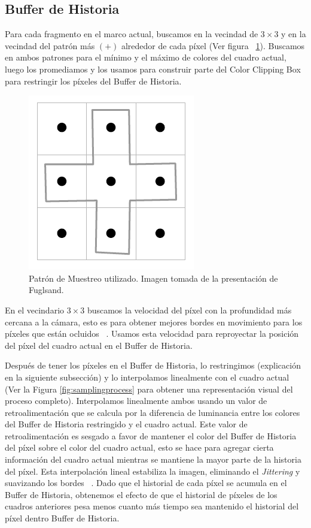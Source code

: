 \documentclass{cslthse-msc}
\begin{document}
\subsection{Buffer de Historia}
Para cada fragmento en el marco actual, buscamos en la vecindad de $3\times 3$ y en la vecindad del patrón más $(+)$ alrededor de cada píxel (Ver figura ~\ref{fig:samplingpattern}). Buscamos en ambos patrones para el mínimo y el máximo de colores del cuadro actual, luego los promediamos y los usamos para construir parte del Color Clipping Box para restringir los píxeles del Buffer de Historia. ~\cite{Fuglsand2016}
\begin{figure}[!hbt]
	\centering
	\includegraphics[scale=0.8]{images/sampling_pattern.png}
	\caption{Patrón de Muestreo utilizado. Imagen tomada de la presentación de Fuglsand. \protect\cite{Fuglsand2016}}\label{fig:samplingpattern}
\end{figure}

En el vecindario $3\times 3$ buscamos la velocidad del píxel con la profundidad más cercana a la cámara, esto es para obtener mejores bordes en movimiento para los píxeles que están ocluidos ~\cite{Fuglsand2016}. Usamos esta velocidad para reproyectar la posición del píxel del cuadro actual en el Buffer de Historia. ~\cite{Fuglsand2016, XU2016}

Después de tener los píxeles en el Buffer de Historia, lo restringimos (explicación en la siguiente subsección) y lo interpolamos linealmente con el cuadro actual (Ver la Figura \ref{fig:samplingprocess} para obtener una representación visual del proceso completo). Interpolamos linealmente ambos usando un valor de retroalimentación que se calcula por la diferencia de luminancia entre los colores del Buffer de Historia restringido y el cuadro actual. Este valor de retroalimentación es sesgado a favor de mantener el color del Buffer de Historia del píxel sobre el color del cuadro actual, esto se hace para agregar cierta información del cuadro actual mientras se mantiene la mayor parte de la historia del píxel. Esta interpolación lineal estabiliza la imagen, eliminando el \textit{Jittering} y suavizando los bordes ~\cite{Fuglsand2016, XU2016}. Dado que el historial de cada píxel se acumula en el Buffer de Historia, obtenemos el efecto de que el historial de píxeles de los cuadros anteriores pesa menos cuanto más tiempo sea mantenido el historial del píxel dentro Buffer de Historia. ~\cite{Fuglsand2016}
\end{document}
